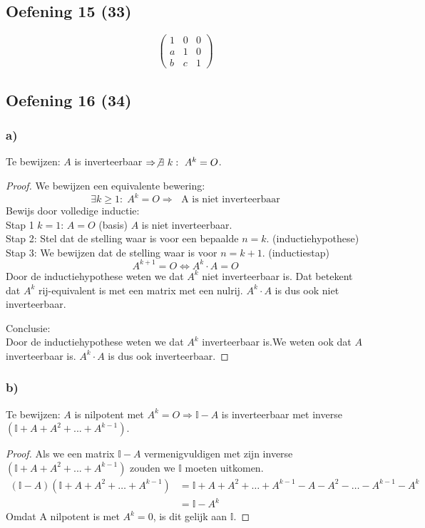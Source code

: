 \documentclass[lineaire_algebra_oplossingen.tex]{subfiles}
\begin{document}
\subsection{Oefening 15 (33)}
\[
\begin{pmatrix}
1 & 0 & 0\\
a & 1 & 0\\
b & c & 1
\end{pmatrix}
\]

\subsection{Oefening 16 (34)}
\subsubsection*{a)}
Te bewijzen: $A$ is inverteerbaar $\Rightarrow \not \exists\ k :\ A^k=O$.
\begin{proof}
We bewijzen een equivalente bewering:
\[
\exists k\ge 1:\;A^k=O \Rightarrow\; \text{ A is niet inverteerbaar}
\]
Bewijs door volledige inductie:\\
Stap 1 $k=1$: $A=O$ (basis)
$A$ is niet inverteerbaar.\\
Stap 2: Stel dat de stelling waar is voor een bepaalde $n=k$. (inductiehypothese)\\

Stap 3: We bewijzen dat de stelling waar is voor $n=k+1$. (inductiestap)\\
\[ A^{k+1}=O \Leftrightarrow A^{k}\cdot A=O \]
Door de inductiehypothese weten we dat $A^{k}$ niet inverteerbaar is. Dat betekent dat $A^{k}$ rij-equivalent is met een matrix met een nulrij. $A^{k} \cdot A$ is dus ook niet inverteerbaar.

Conclusie:\\
Door de inductiehypothese weten we dat $A^{k}$ inverteerbaar is.We weten ook dat $A$ inverteerbaar is. $A^{k} \cdot A$ is dus ook inverteerbaar.

\end{proof}

\subsubsection*{b)}
Te bewijzen: $A$ is nilpotent met $A^k=O \Rightarrow \mathbb{I}-A$ is inverteerbaar met inverse $(\mathbb{I}+A+A^2+...+A^{k-1})$.
\begin{proof}
Als we een matrix $\mathbb{I}-A$ vermenigvuldigen met zijn inverse $(\mathbb{I}+A+A^2+...+A^{k-1})$ zouden we $\mathbb{I}$ moeten uitkomen.
\begin{align*}
(\mathbb{I}-A)(\mathbb{I}+A+A^2+ \ldots +A^{k-1})
&= \mathbb{I} + A + A^2 + \ldots + A^{k-1} - A - A^2 - \ldots - A^{k-1} - A^k \\
&= \mathbb{I}-A^{k}
\end{align*}
Omdat A nilpotent is met $A^k=0$, is dit gelijk aan $\mathbb{I}.$
\end{proof}
\end{document}
